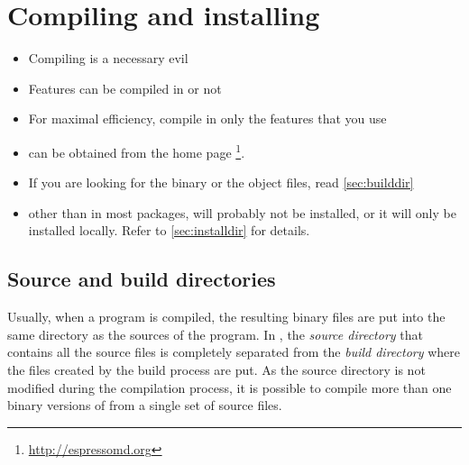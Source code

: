%  
%   
%  
%  
%
\chapter{Compiling and installing \es}
\label{chap:install}

\begin{itemize}
\item Compiling \es{} is a necessary evil
\item Features can be compiled in or not
\item For maximal efficiency, compile in only the features that you
  use
\item \es{} can be obtained from the \es{} home page
  \footnote{\url{http://espressomd.org}}.
\item If you are looking for the \es binary or the object files, read
  \vref{sec:builddir}
\item other than in most packages, \es will probably not be installed,
  or it will only be installed locally. Refer to \vref{sec:installdir}
  for details.
\end{itemize}

\section{Source and build directories}
\label{sec:builddir}
 

Usually, when a program is compiled, the resulting binary files are
put into the same directory as the sources of the program. In \es, the
\emph{source directory} that contains all the source files is
completely separated from the \emph{build directory} where the files
created by the build process are put. As the source directory is not
modified during the compilation process, it is possible to compile more
than one binary versions of \es from a single set of source files.

